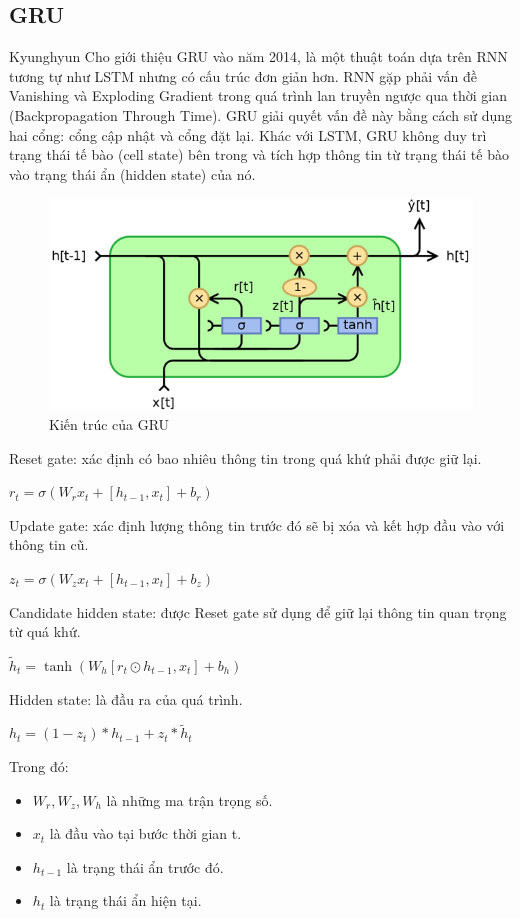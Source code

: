 \documentclass[conference]{IEEEtran}
\begin{document}
\subsection{GRU}
Kyunghyun Cho giới thiệu GRU vào năm 2014, là một thuật toán dựa trên RNN tương tự như LSTM nhưng có cấu trúc đơn giản hơn. RNN gặp phải vấn đề Vanishing và Exploding Gradient trong quá trình lan truyền ngược qua thời gian (Backpropagation Through Time). GRU giải quyết vấn đề này bằng cách sử dụng hai cổng: cổng cập nhật và cổng đặt lại. Khác với LSTM, GRU không duy trì trạng thái tế bào (cell state) bên trong và tích hợp thông tin từ trạng thái tế bào vào trạng thái ẩn (hidden state) của nó\cite{ComparisonGRU&ARIMA}.
\begin{figure}[H]
    \centering
    \begin{minipage}{0.8\linewidth}
    \centering
        \vspace{0pt}
        \includegraphics[width=0.8\linewidth]{images/GRU.png}
        \vspace{0pt}
    \caption{Kiến trúc của GRU}
    \label{fig8}
    \end{minipage}
\end{figure}
Reset gate: xác định có bao nhiêu thông tin trong quá khứ phải được giữ lại.
\begin{center}
\(r_t = \sigma(W_r x_t + [h_{t-1}, x_t] + b_r)\)
\end{center}
Update gate: xác định lượng thông tin trước đó sẽ bị xóa và kết hợp đầu vào với thông tin cũ.
\begin{center}
\(z_t = \sigma(W_z x_t + [h_{t-1}, x_t] + b_z)\)
\end{center}
Candidate hidden state: được Reset gate sử dụng để giữ lại thông tin quan trọng từ quá khứ.
\begin{center}
\(\tilde{h}_t = \tanh(W_h [r_t \odot h_{t-1}, x_t] + b_h)\)
\end{center}
Hidden state: là đầu ra của quá trình.
\begin{center}
\(h_t = (1 - z_t) * h_{t-1} + z_t * \tilde{h}_t\)
\end{center}
Trong đó:
\begin{itemize}
    \item $W_r, W_z, W_h$ là những ma trận trọng số.
    \item $x_t$ là đầu vào tại bước thời gian t.
    \item $h_{t-1}$ là trạng thái ẩn trước đó.
    \item $h_t$ là trạng thái ẩn hiện tại.
\end{itemize}
\end{document}
